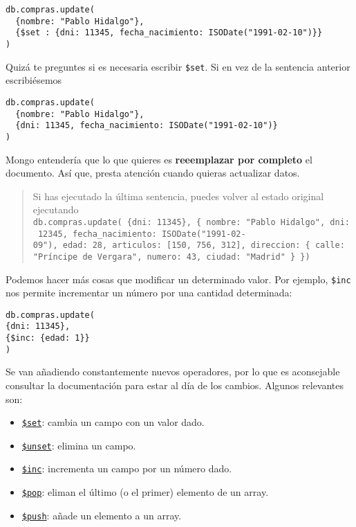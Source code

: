 \documentclass[]{article}
\providecommand{\tightlist}{%
  \setlength{\itemsep}{0pt}\setlength{\parskip}{0pt}}
\begin{document}
\begin{verbatim}
db.compras.update(
  {nombre: "Pablo Hidalgo"},
  {$set : {dni: 11345, fecha_nacimiento: ISODate("1991-02-10")}}
)
\end{verbatim}

Quizá te preguntes si es necesaria escribir \texttt{\$set}. Si en vez de
la sentencia anterior escribiésemos

\begin{verbatim}
db.compras.update(
  {nombre: "Pablo Hidalgo"},
  {dni: 11345, fecha_nacimiento: ISODate("1991-02-10")}
)
\end{verbatim}

Mongo entendería que lo que quieres es \textbf{reeemplazar por completo}
el documento. Así que, presta atención cuando quieras actualizar datos.

\begin{quote}
Si has ejecutado la última sentencia, puedes volver al estado original
ejecutando
\texttt{db.compras.update(\ \{dni:\ 11345\},\ \{\ nombre:\ "Pablo\ Hidalgo",\ dni:\ 12345,\ fecha\_nacimiento:\ ISODate("1991-02-09"),\ edad:\ 28,\ articulos:\ {[}150,\ 756,\ 312{]},\ direccion:\ \{\ calle:\ "Príncipe\ de\ Vergara",\ numero:\ 43,\ ciudad:\ "Madrid"\ \}\ \})}
\end{quote}

Podemos hacer más cosas que modificar un determinado valor. Por ejemplo,
\texttt{\$inc} nos permite incrementar un número por una cantidad
determinada:

\begin{verbatim}
db.compras.update(
{dni: 11345},
{$inc: {edad: 1}}
)
\end{verbatim}

Se van añadiendo constantemente nuevos operadores, por lo que es
aconsejable consultar la documentación para estar al día de los cambios.
Algunos relevantes son:

\begin{itemize}
\tightlist
\item
  \href{https://docs.mongodb.com/manual/reference/operator/update/set/}{\texttt{\$set}}:
  cambia un campo con un valor dado.
\item
  \href{https://docs.mongodb.com/manual/reference/operator/update/unset/}{\texttt{\$unset}}:
  elimina un campo.
\item
  \href{https://docs.mongodb.com/manual/reference/operator/update/inc/}{\texttt{\$inc}}:
  incrementa un campo por un número dado.
\item
  \href{https://docs.mongodb.com/manual/reference/operator/update/pop/}{\texttt{\$pop}}:
  eliman el último (o el primer) elemento de un array.
\item
  \href{https://docs.mongodb.com/manual/reference/operator/update/push/}{\texttt{\$push}}:
  añade un elemento a un array.
\end{itemize}
\end{document}
